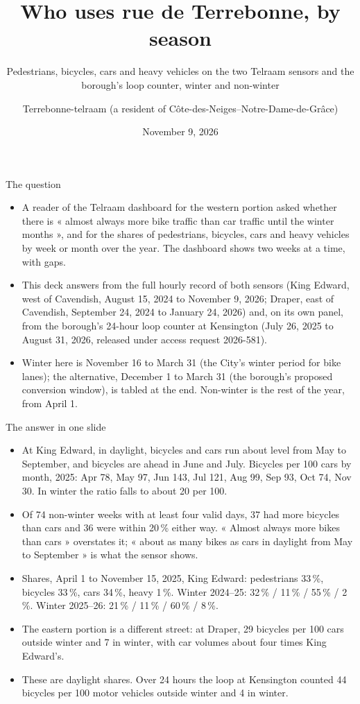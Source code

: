 \documentclass[aspectratio=169,10pt]{beamer}\usetheme{default}\usecolortheme{seahorse}\setbeamertemplate{navigation symbols}{}\setbeamertemplate{footline}[frame number]
\title{Who uses rue de Terrebonne, by season}\subtitle{Pedestrians, bicycles, cars and heavy vehicles on the two Telraam sensors and the borough\textquoteright{}s loop counter, winter and non-winter}\author{Terrebonne-telraam (a resident of Côte-des-Neiges--Notre-Dame-de-Grâce)}\date{November 9, 2026}
\begin{document}
\begin{frame}\titlepage\end{frame}
\begin{frame}{The question}\begin{itemize}
\item A reader of the Telraam dashboard for the western portion asked whether there is « almost always more bike traffic than car traffic until the winter months », and for the shares of pedestrians, bicycles, cars and heavy vehicles by week or month over the year. The dashboard shows two weeks at a time, with gaps.
\item This deck answers from the full hourly record of both sensors (King Edward, west of Cavendish, August 15, 2024 to November 9, 2026; Draper, east of Cavendish, September 24, 2024 to January 24, 2026) and, on its own panel, from the borough\textquoteright{}s 24-hour loop counter at Kensington (July 26, 2025 to August 31, 2026, released under access request 2026-581).
\item Winter here is November 16 to March 31 (the City\textquoteright{}s winter period for bike lanes); the alternative, December 1 to March 31 (the borough\textquoteright{}s proposed conversion window), is tabled at the end. Non-winter is the rest of the year, from April 1.
\end{itemize}\end{frame}
\begin{frame}{The answer in one slide}\begin{itemize}
\item At King Edward, in daylight, bicycles and cars run about level from May to September, and bicycles are ahead in June and July. Bicycles per 100 cars by month, 2025: Apr 78, May 97, Jun 143, Jul 121, Aug 99, Sep 93, Oct 74, Nov 30. In winter the ratio falls to about 20 per 100.
\item Of 74 non-winter weeks with at least four valid days, 37 had more bicycles than cars and 36 were within 20\,\% either way. « Almost always more bikes than cars » overstates it; « about as many bikes as cars in daylight from May to September » is what the sensor shows.
\item Shares, April 1 to November 15, 2025, King Edward: pedestrians 33\,\%, bicycles 33\,\%, cars 34\,\%, heavy 1\,\%. Winter 2024--25: 32\,\% / 11\,\% / 55\,\% / 2\,\%. Winter 2025--26: 21\,\% / 11\,\% / 60\,\% / 8\,\%.
\item The eastern portion is a different street: at Draper, 29 bicycles per 100 cars outside winter and 7 in winter, with car volumes about four times King Edward\textquoteright{}s.
\item These are daylight shares. Over 24 hours the loop at Kensington counted 44 bicycles per 100 motor vehicles outside winter and 4 in winter.
\end{itemize}\end{frame}
\end{document}
